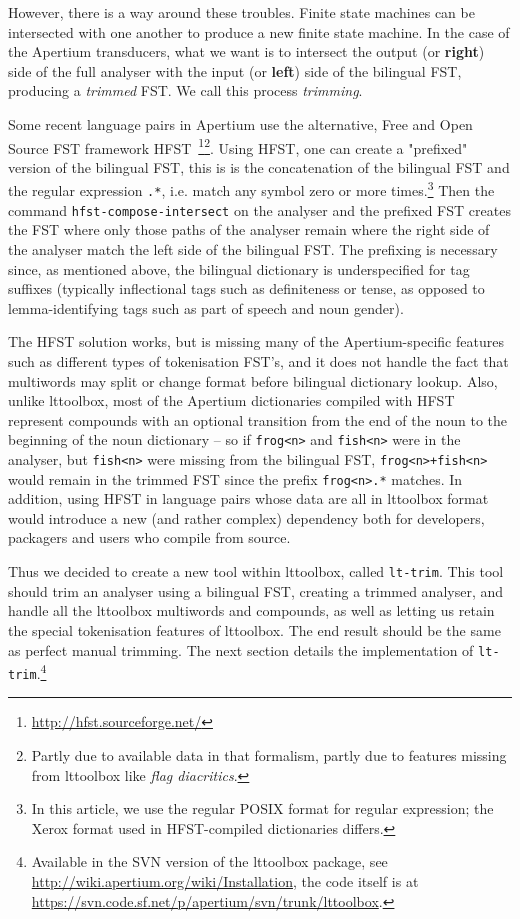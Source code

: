 \documentclass[10pt, a4paper]{article}
\newcommand{\ana}[1]{\texttt{#1}}
\newcommand{\tool}[1]{\texttt{#1}}
\begin{document}
However, there is a way around these troubles. Finite state machines
can be intersected with one another to produce a new finite state
machine. In the case of the Apertium transducers, what we want is to
intersect the output (or \textbf{right}) side of the full analyser
with the input (or \textbf{left}) side of the bilingual FST, producing
a \emph{trimmed} FST. We call this process \emph{trimming}.

Some recent language pairs in Apertium use the alternative, Free and
Open Source FST framework
HFST~\cite{linden2011hfst}\footnote{\href{http://hfst.sourceforge.net/}{http://hfst.sourceforge.net/}}\footnote{Partly
  due to available data in that formalism, partly due to features
  missing from lttoolbox like \emph{flag diacritics}.}. Using HFST,
one can create a "prefixed" version of the bilingual FST, this is is
the concatenation of the bilingual FST and the regular expression
\ana{.*}, i.e. match any symbol zero or more times.\footnote{In this
  article, we use the regular POSIX format for regular expression; the
  Xerox format used in HFST-compiled dictionaries differs.} Then the
command \tool{hfst-compose-intersect} on the analyser and the prefixed
FST creates the FST where only those paths of the analyser remain
where the right side of the analyser match the left side of the
bilingual FST. The prefixing is necessary since, as mentioned above,
the bilingual dictionary is underspecified for tag suffixes (typically
inflectional tags such as definiteness or tense, as opposed to
lemma-identifying tags such as part of speech and noun gender).

The HFST solution works, but is missing many of the Apertium-specific
features such as different types of tokenisation FST's, and it does
not handle the fact that multiwords may split or change format before
bilingual dictionary lookup. Also, unlike lttoolbox, most of the
Apertium dictionaries compiled with HFST represent compounds with an
optional transition from the end of the noun to the beginning of the
noun dictionary -- so if \ana{frog<n>} and \ana{fish<n>} were in the
analyser, but \ana{fish<n>} were missing from the bilingual FST,
\ana{frog<n>+fish<n>} would remain in the trimmed FST since the prefix
\ana{frog<n>.*} matches. In addition, using HFST in language pairs
whose data are all in lttoolbox format would introduce a new (and
rather complex) dependency both for developers, packagers and users
who compile from source.

Thus we decided to create a new tool within lttoolbox, called
\tool{lt-trim}. This tool should trim an analyser using a bilingual
FST, creating a trimmed analyser, and handle all the lttoolbox
multiwords and compounds, as well as letting us retain the special
tokenisation features of lttoolbox. The end result should be the same
as perfect manual trimming. The next section details the
implementation of \tool{lt-trim}.\footnote{Available in the SVN
  version of the lttoolbox package, see
  \href{http://wiki.apertium.org/wiki/Installation}{http://wiki.apertium.org/wiki/Installation},
  the code itself is at
  \href{https://svn.code.sf.net/p/apertium/svn/trunk/lttoolbox}{https://svn.code.sf.net/p/apertium/svn/trunk/lttoolbox}.}
\end{document}
